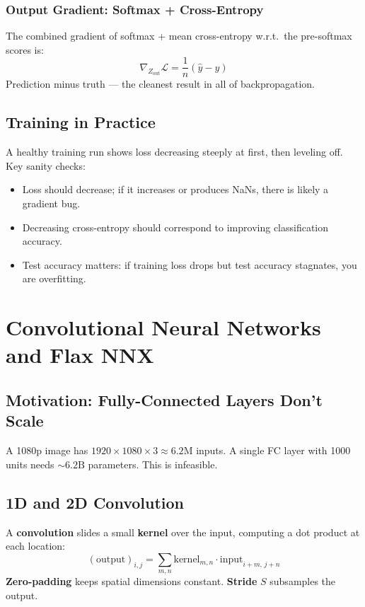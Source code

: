 \documentclass[11pt]{article}
\begin{document}
\subsubsection{Output Gradient: Softmax + Cross-Entropy}

The combined gradient of softmax + mean cross-entropy w.r.t.\ the pre-softmax scores is:
\[
\nabla_{Z_{\text{out}}}\mathcal{L} = \frac{1}{n}(\hat{y} - y)
\]
Prediction minus truth --- the cleanest result in all of backpropagation.

\subsection{Training in Practice}

A healthy training run shows loss decreasing steeply at first, then leveling off. Key sanity checks:
\begin{itemize}
  \item Loss should decrease; if it increases or produces NaNs, there is likely a gradient bug.
  \item Decreasing cross-entropy should correspond to improving classification accuracy.
  \item Test accuracy matters: if training loss drops but test accuracy stagnates, you are overfitting.
\end{itemize}

\section{Convolutional Neural Networks and Flax NNX}

\subsection{Motivation: Fully-Connected Layers Don't Scale}
A 1080p image has $1920 \times 1080 \times 3 \approx 6.2\text{M}$ inputs. A single FC layer with 1000 units needs $\sim 6.2\text{B}$ parameters. This is infeasible.

\subsection{1D and 2D Convolution}
A \textbf{convolution} slides a small \textbf{kernel} over the input, computing a dot product at each location:
\[
  (\text{output})_{i,j} = \sum_{m,n} \text{kernel}_{m,n} \cdot \text{input}_{i+m,\, j+n}
\]
\textbf{Zero-padding} keeps spatial dimensions constant. \textbf{Stride} $S$ subsamples the output.
\end{document}
